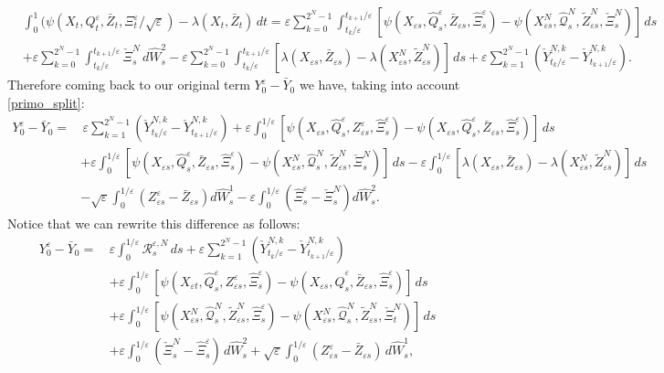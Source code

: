 \documentclass[reqno,a4paper,11 pt]{article}
\def \e {\varepsilon}
\numberwithin{equation}{section}
\begin{document}
\begin{align}\label{decI2}
&\int_0^1  (\psi({X}_t,Q^\e_t,\bar{Z}_t,\Xi^\e_t/\sqrt{\e}) -\lambda({X}_t,\bar{Z}_t)\,dt=\e \sum _{k=0}^{2^N-1}\int_{t_k/\e}^{t_{k+1}/\e}  [\psi(X_{\e s},\hat{Q}^\e_{ s},\bar{Z}_{\e s},\hat{ \Xi}^\e_{s}) - \psi({X}^N_{\e s},\hat{\mathcal{Q}}^{N}_{ s},\widetilde{Z}^N_{\e s},\check{\Xi}^N_s)]\,ds  \\&+\e \sum _{k=0}^{2^N-1}\int_{t_{k}/\e }^{t_{k+1}/\e }\check{\Xi}^{N}_s \, d\hat{W}^2_s 
-\e\sum _{k=0}^{2^N-1}\int_{t_k/\e}^{t_{k+1}/\e} [\lambda({X}_{\e s},\bar{Z}_{\e s})- \lambda(X^N_{\e s},\widetilde{Z}^N_{\e s})]\,ds \nonumber +\e  \sum_{k=1}^{2^N-1} (\check{Y}^{N,k}_{t_{k}/\e}-\check{Y}^{N,k}_{t_{k+1}/\e })
.\end{align}
Therefore coming back to our original term $Y^{\e}_0-\bar{Y}_0$ we have, taking into account \eqref{primo_split}:
\begin{align*}
Y^{\e}_0-\bar{Y}_0= & \, \e  \sum_{k=1}^{2^N-1} ( \check{Y}^{N,k}_{t_k/\e}-\check{Y}^{N,k}_{t_{k+1}/\e} )+\e\int_0^{1/\e} \left[\psi(X_{\e s }, \hat{Q}^{\e}_s, Z^{\e}_{\e s }, \hat{\Xi}^{\e}_s)-\psi(X_{\e s }, \hat{Q}^{\e}_s, \bar{Z}_{\e s }, \hat{\Xi}^{\e}_s)\right] \,ds\\&  
+\e \int_{0}^{1/\e}  [\psi(X_{\e s},\hat{Q}^\e_{ s},\bar{Z}_{\e s},\hat{ \Xi}^\e_{s}) - \psi({X}^N_{\e s},\hat{\mathcal{Q}}^{N}_{ s},\widetilde{Z}^N_{\e s},\check{\Xi}^N_s)]\,ds 
-\e\int_{0}^{1/\e} [\lambda({X}_{\e s},\bar{Z}_{\e s})- \lambda(X^N_{\e s},\widetilde{Z}^N_{\e s})]\,ds \\ &
-\sqrt{\e}\int_0^{1/\e } (Z^{\e}_{\e s}-\bar{Z}_{\e s}) d \hat{W}^1_s - {\e}\int_0^{1/\e } (\hat{\Xi}^{\e}_{ s}-\check{\Xi}^N_{ s}) d \hat{W}^2_s .
\end{align*}
Notice that we can rewrite this difference as follows:
\begin{equation}\label{secondo_split}
\begin{split}
 Y^\e _0 -\bar Y_0 = \, & 
 \e \int_0^{1/\e} {\mathcal{R}}^{\e,N}_s \, ds
 +\e  \sum_{k=1}^{2^N-1} (\check{Y}^{N,k}_{t_{k}/\e}-\check{Y}^{N,k}_{t_{k+1}/\e })\\ &     +\e \int_0^{1/\e}[\psi({X}_{\e t},\hat{{Q}}^{\e}_{s},{Z}^{\e}_{\e s},\hat{\Xi}^\e_s)-\psi({X}_{\e s},\hat{Q}^{\e}_{s},\bar{Z}_{\e s},\hat{\Xi}^\e_s)]\, ds \\ &  
  +\e \int_0^{1/\e}[\psi({X}^N_{\e s},\hat{\mathcal{Q}}^{N}_{s},\widetilde{Z}^N_{\e s},\hat{\Xi}^\e_s)-\psi({X}^N_{\e s},\hat{\mathcal{Q}}^N_s,\widetilde{Z}^N_{\e s},\check{\Xi}^N_t)]\, ds
 \\ & 
  +  \e \int_0^{1/\e}(\check{\Xi}^{N}_s -\hat{\Xi}^\e_s)  \, d\hat{W}^2_s +\sqrt{\e}\int_0^{1/\e} (Z^\e_{\e s}-\bar{Z}_{ \e s})\,d \hat{W}^1_s,
\end{split}
\end{equation}
\end{document}
